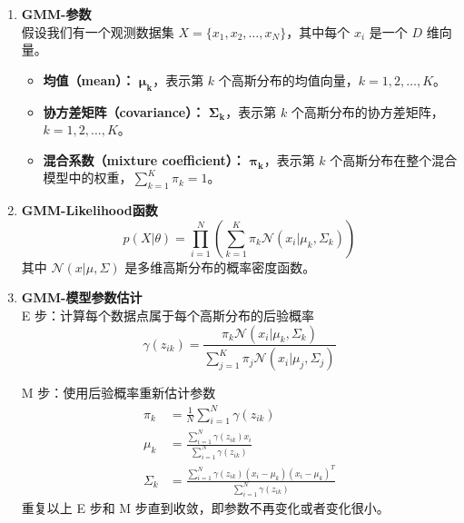 \documentclass[12pt,a4paper]{nmmcm}
\begin{document}
\begin{enumerate}

  \item \textbf{GMM-参数} \\
        假设我们有一个观测数据集 $X = \{x_1, x_2, \ldots, x_N\}$，其中每个 $x_i$ 是一个 $D$ 维向量。
        \begin{itemize}
          \item \textbf{均值（mean）：} $\boldsymbol{\mu_k}$，表示第 $k$ 个高斯分布的均值向量，$k = 1, 2, \ldots, K$。
          \item \textbf{协方差矩阵（covariance）：} $\boldsymbol{\Sigma_k}$，表示第 $k$ 个高斯分布的协方差矩阵，$k = 1, 2, \ldots, K$。
          \item \textbf{混合系数（mixture coefficient）：} $\boldsymbol{\pi_k}$，表示第 $k$ 个高斯分布在整个混合模型中的权重，$\sum_{k=1}^K \pi_k = 1$。
        \end{itemize}

  \item \textbf{GMM-Likelihood函数} \\
        \begin{equation*}
          p(X | \theta) = \prod_{i=1}^N \left( \sum_{k=1}^K \pi_k \mathcal{N}(x_i | \mu_k, \Sigma_k) \right)
        \end{equation*}
        其中 \( \mathcal{N}(x | \mu, \Sigma) \) 是多维高斯分布的概率密度函数。

  \item \textbf{GMM-模型参数估计} \\
        E 步：计算每个数据点属于每个高斯分布的后验概率
        \begin{equation*}
          \gamma(z_{ik}) = \frac{\pi_k \mathcal{N}(x_i | \mu_k, \Sigma_k)}{\sum_{j=1}^K \pi_j \mathcal{N}(x_i | \mu_j, \Sigma_j)}
        \end{equation*}

        M 步：使用后验概率重新估计参数
        \begin{align*}
          \pi_k    & = \frac{1}{N} \sum_{i=1}^N \gamma(z_{ik})                                                      \\
          \mu_k    & = \frac{\sum_{i=1}^N \gamma(z_{ik}) x_i}{\sum_{i=1}^N \gamma(z_{ik})}                          \\
          \Sigma_k & = \frac{\sum_{i=1}^N \gamma(z_{ik}) (x_i - \mu_k)(x_i - \mu_k)^T}{\sum_{i=1}^N \gamma(z_{ik})}
        \end{align*}
        重复以上 E 步和 M 步直到收敛，即参数不再变化或者变化很小。
\end{enumerate}
\end{document}
